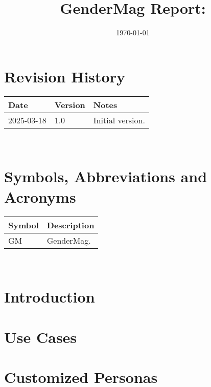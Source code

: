 \documentclass[12pt, titlepage]{article}
\begin{document}
\title{GenderMag Report: \progname} 
\author{\authname}
\date{\today}
	
\maketitle


\section{Revision History}

\begin{tabularx}{\textwidth}{p{3cm}p{2cm}X}
\toprule {\bf Date} & {\bf Version} & {\bf Notes}\\
\midrule
2025-03-18 & 1.0 & Initial version.\\
\bottomrule
\end{tabularx}

~\newpage

\section{Symbols, Abbreviations and Acronyms}

\renewcommand{\arraystretch}{1.2}
\begin{table}[h!]
  \vspace{5pt}
  \begin{tabular}{l l} 
    \toprule		
    \textbf{Symbol} & \textbf{Description} \\
    \midrule 
    GM & GenderMag. \\
    \bottomrule
  \end{tabular}\\
\end{table}
\newpage

\tableofcontents

\newpage

\newpage

\section{Introduction}


\section{Use Cases}


\section{Customized Personas}
\end{document}
